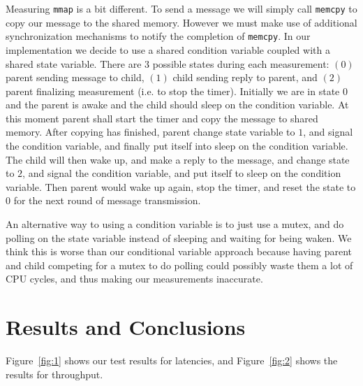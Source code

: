 \documentclass[11pt,conference]{IEEEtran}
\begin{document}
Measuring \texttt{mmap} is a bit different.
To send a message we will simply call \texttt{memcpy} to copy our message to the shared memory.
However we must make use of additional synchronization mechanisms to notify the completion of \texttt{memcpy}.
In our implementation we decide to use a shared condition variable coupled with a shared state variable.
There are $3$ possible states during each measurement: $(0)$ parent sending message to child, $(1)$ child sending reply to parent, and $(2)$ parent finalizing measurement (i.e. to stop the timer).
Initially we are in state $0$ and the parent is awake and the child should sleep on the condition variable.
At this moment parent shall start the timer and copy the message to shared memory.
After copying has finished, parent change state variable to $1$, and signal the condition variable, and finally put itself into sleep on the condition variable.
The child will then wake up, and make a reply to the message, and change state to $2$, and signal the condition variable, and put itself to sleep on the condition variable.
Then parent would wake up again, stop the timer, and reset the state to $0$ for the next round of message transmission.

An alternative way to using a condition variable is to just use a mutex, and do polling on the state variable instead of sleeping and waiting for being waken.
We think this is worse than our conditional variable approach because having parent and child competing for a mutex to do polling could possibly waste them a lot of CPU cycles, and thus making our measurements inaccurate.

\section{Results and Conclusions}
\label{sec:results}
Figure~\ref{fig:1} shows our test results for latencies, and Figure~\ref{fig:2} shows the results for throughput.



%
%
%




\end{document}

